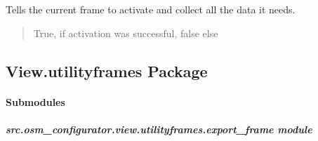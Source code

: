 \documentclass[letterpaper,10pt,english]{sphinxmanual}
\begin{document}
\begin{fulllineitems}
\begin{fulllineitems}
\begin{quote}
\begin{description}
\end{description}\end{quote}

\end{fulllineitems}


\begin{fulllineitems}
\label{\detokenize{apidoc/src.osm_configurator.view.toplevelframes:src.osm_configurator.view.toplevelframes.top_level_frame.TopLevelFrame.activate}}
\pysigstartsignatures
{}
\pysigstopsignatures
\sphinxAtStartPar
Tells the current frame to activate and collect all the data it needs.
\begin{quote}\begin{description}
\sphinxAtStartPar
True, if activation was successful, false else

\sphinxAtStartPar
{}

\end{description}\end{quote}

\end{fulllineitems}


\end{fulllineitems}





\subsection{View.utilityframes Package}

\paragraph{Submodules}
\label{\detokenize{apidoc/src.osm_configurator.view.utilityframes:submodules}}



\subparagraph{src.osm\_configurator.view.utilityframes.export\_frame module}
\label{\detokenize{apidoc/src.osm_configurator.view.utilityframes:module-src.osm_configurator.view.utilityframes.export_frame}}\label{\detokenize{apidoc/src.osm_configurator.view.utilityframes:src-osm-configurator-view-utilityframes-export-frame-module}}
\end{document}
